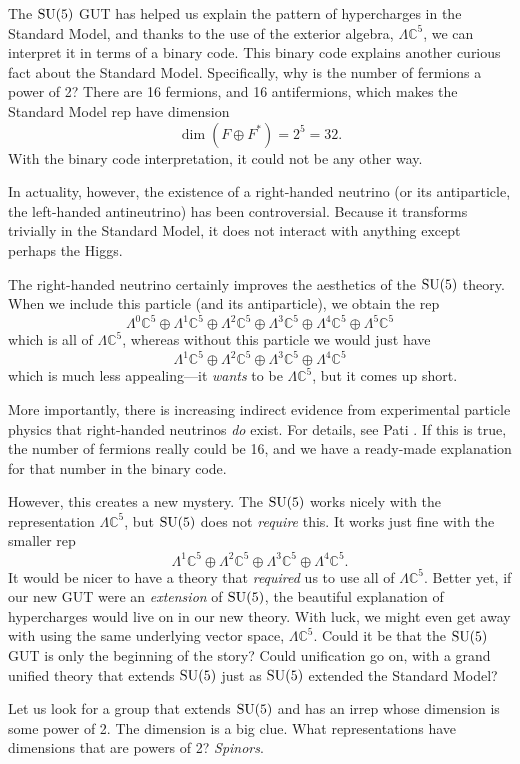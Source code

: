 \documentclass{article}
\newcommand{\C}{{\mathbb C}}  %
\newcommand{\SU}{{\rm SU}}    %
\newcommand{\Ex}{\Lambda} %
\begin{document}
The $\SU(5)$ GUT has helped us explain the pattern of hypercharges in the
Standard Model, and thanks to the use of the exterior algebra, $\Ex \C^5$, we
can interpret it in terms of a binary code. This binary code explains another
curious fact about the Standard Model. Specifically, why is the number of
fermions a power of 2? There are 16 fermions, and 16 antifermions, which 
makes the
Standard Model rep have dimension
\[ \dim (F \oplus F^*) = 2^5 = 32. \]
With the binary code interpretation, it could not be any other way.

In actuality, however, the existence of a right-handed neutrino (or its
antiparticle, the left-handed antineutrino) has been controversial. Because it
transforms trivially in the Standard Model, it does not interact
with anything except perhaps the Higgs.

The right-handed neutrino certainly improves the aesthetics of the
$\SU(5)$ theory.  When we include this particle (and its antiparticle),
we obtain the rep
\[ \Ex^0 \C^5 \oplus \Ex^1 \C^5 \oplus \Ex^2 \C^5 \oplus \Ex^3 \C^5 \oplus \Ex^4 \C^5 \oplus \Ex^5 \C^5    \]
which is all of $\Ex \C^5$, whereas without this particle
we would just have
\[ \Ex^1 \C^5 \oplus \Ex^2 \C^5 \oplus \Ex^3 \C^5 \oplus \Ex^4 \C^5  \]
which is much less appealing---it \emph{wants} to be $\Ex \C^5$, but
it comes up short.   

More importantly, there is increasing indirect evidence from
experimental particle physics that right-handed neutrinos \emph{do}
exist.   For details, see Pati \cite{pati:probing}.  
If this is true, the number of fermions really could be 16, and we have a
ready-made explanation for that number in the binary code.

However, this creates a new mystery.  The
$\SU(5)$ works nicely with the representation $\Ex \C^5$, but $\SU(5)$ does 
not \emph{require} this.  It works just fine with the smaller rep
\[ \Ex^1 \C^5 \oplus \Ex^2 \C^5 \oplus \Ex^3 \C^5 \oplus \Ex^4 \C^5 .\]
It would be nicer to have a theory that \emph{required} us
to use all of $\Lambda \C^5$.  Better yet, if our new GUT were an
\emph{extension} of $\SU(5)$, the beautiful explanation of hypercharges
would live on in our new theory.  With luck, we might even get away with 
using the same underlying vector space, $\Ex \C^5$.
Could it be that the $\SU(5)$ GUT is only the beginning of the story? Could
unification go on, with a grand unified theory that extends $\SU(5)$ just as
$\SU(5)$ extended the Standard Model?

Let us look for a group that extends $\SU(5)$ and has an irrep whose
dimension is some power of 2.  The dimension is a big clue.  What
representations have dimensions that are powers of 2? \emph{Spinors}.
\end{document}
